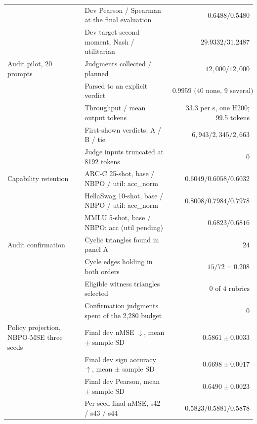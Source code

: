 \begin{tabular}{p{2.9cm}p{6.0cm}r}
 & Dev Pearson / Spearman at the final evaluation & $0.6488 / 0.5480$\\
 & Dev target second moment, Nash / utilitarian & $29.9332 / 31.2487$\\
Audit pilot, 20 prompts & Judgments collected / planned & $12{,}000 / 12{,}000$\\
 & Parsed to an explicit verdict & $0.9959 \textrm{ (40 none, 9 several)}$\\
 & Throughput / mean output tokens & \textrm{33.3 per s, one H200; 99.5 tokens}\\
 & First-shown verdicts: A / B / tie & $6{,}943 / 2{,}345 / 2{,}663$\\
 & Judge inputs truncated at 8192 tokens & $0$\\
Capability retention & ARC-C 25-shot, base / NBPO / util: acc\_norm & $0.6049 / 0.6058 / 0.6032$\\
 & HellaSwag 10-shot, base / NBPO / util: acc\_norm & $0.8008 / 0.7984 / 0.7978$\\
 & MMLU 5-shot, base / NBPO: acc (util pending) & $0.6823 / 0.6816$\\
Audit confirmation & Cyclic triangles found in panel A & $24$\\
 & Cycle edges holding in both orders & $15 / 72 = 0.208$\\
 & Eligible witness triangles selected & $0 \textrm{ of 4 rubrics}$\\
 & Confirmation judgments spent of the 2{,}280 budget & $0$\\
Policy projection, NBPO-MSE three seeds & Final dev nMSE $\downarrow$, mean $\pm$ sample SD & $0.5861 \pm 0.0033$\\
 & Final dev sign accuracy $\uparrow$, mean $\pm$ sample SD & $0.6698 \pm 0.0017$\\
 & Final dev Pearson, mean $\pm$ sample SD & $0.6490 \pm 0.0023$\\
 & Per-seed final nMSE, s42 / s43 / s44 & $0.5823 / 0.5881 / 0.5878$\\
\bottomrule
\end{tabular}
